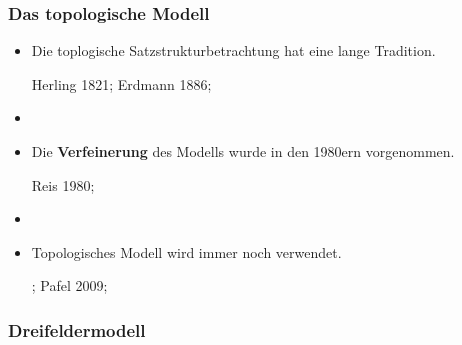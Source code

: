 \begin{frame}
\frametitle{Das topologische Modell}

\begin{itemize}
	\item Die toplogische Satzstrukturbetrachtung hat eine lange Tradition.
	
	\ras Herling 1821; Erdmann 1886; \textbf{\citealt{Drach39a}}
	
	\item[]
	\item Die \textbf{Verfeinerung} des Modells wurde in den 1980ern vorgenommen. 
	
	\ras Reis 1980; \citealt{Hoehle85a}
	
	\item[]
	
	\item Topologisches Modell wird immer noch verwendet.
	
	\ras \citealt{Ramers06a}; Pafel 2009; \citealt{Woellstein10a} 


\end{itemize}

\end{frame}


\subsubsection{Dreifeldermodell}



